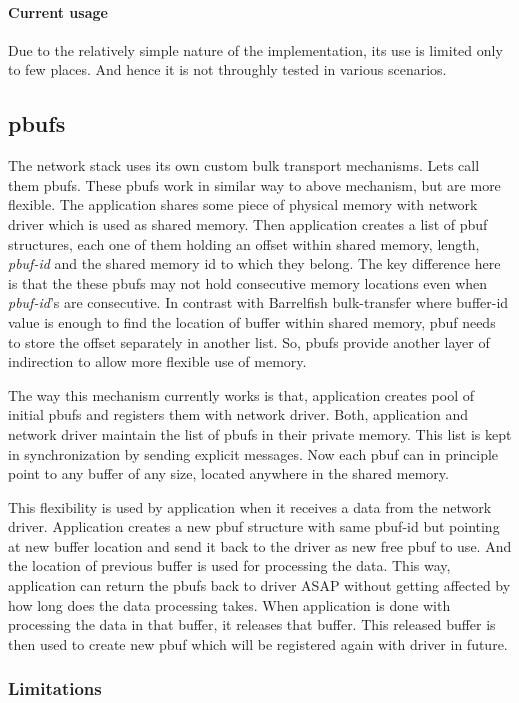 \documentclass[a4paper,twoside]{report} %
\begin{document}
\paragraph{Current usage}
Due to the relatively simple nature of the implementation, its use is
limited only to few places. And hence it is not throughly tested in
various scenarios. 

\subsection{pbufs}
The network stack uses its own custom bulk transport mechanisms.  Lets
call them pbufs.  These pbufs work in similar way to above mechanism,
but are more flexible.  The application shares some piece of physical memory
with network driver which is used as shared memory.  Then application
creates a list of pbuf structures, each one of them holding an offset
within shared memory, length, \textit{pbuf-id} and the shared memory id to
which they belong.  The key difference here is that the these pbufs 
may not hold consecutive memory locations even when \textit{pbuf-id}'s are
consecutive.  In contrast with Barrelfish bulk-transfer where buffer-id
value is enough to find the location of buffer within shared memory,
pbuf needs to store the offset separately in another list.  So,
pbufs provide another layer of indirection to allow more
flexible use of memory.


The way this mechanism currently works is that, application creates
pool of initial pbufs and registers them with network driver.  Both,
application and network driver maintain the list of pbufs in their
private memory.  This list is kept in synchronization by sending
explicit messages.  Now each pbuf can in principle point to any
buffer of any size, located anywhere in the shared memory.


This flexibility is used by application when it receives a data from
the network driver.  Application creates a new pbuf structure with
same pbuf-id but pointing at new buffer location and send it back to
the driver as new free pbuf to use.  And the location of previous
buffer is used for processing the data.  This way, application can
return the pbufs back to driver ASAP without getting affected by how
long does the data processing takes.  When application is done with
processing the data in that buffer, it releases that buffer.  This
released buffer is then used to create new pbuf which will be
registered again with driver in future. 

\subsubsection{Limitations}
\end{document}
